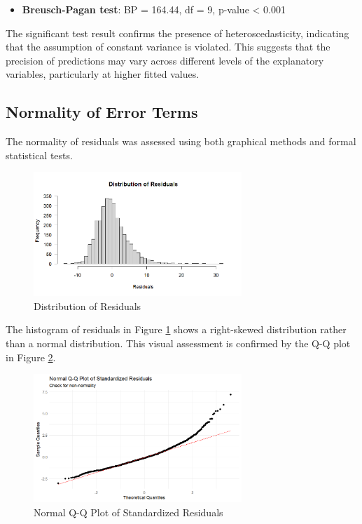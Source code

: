 \documentclass[12pt]{article}
\begin{document}
\begin{itemize}
    \item \textbf{Breusch-Pagan test}: BP = 164.44, df = 9, p-value < 0.001
\end{itemize}

The significant test result confirms the presence of heteroscedasticity, indicating that the assumption of constant variance is violated. This suggests that the precision of predictions may vary across different levels of the explanatory variables, particularly at higher fitted values.

\subsection{Normality of Error Terms}

The normality of residuals was assessed using both graphical methods and formal statistical tests.

\begin{figure}[H]
\centering
\includegraphics[width=0.7\textwidth]{media/Distribution of Residuals.png}
\caption{Distribution of Residuals}
\label{fig:residuals}
\end{figure}

The histogram of residuals in Figure \ref{fig:residuals} shows a right-skewed distribution rather than a normal distribution. This visual assessment is confirmed by the Q-Q plot in Figure \ref{fig:qq_plot}.

\begin{figure}[H]
\centering
\includegraphics[width=0.7\textwidth]{media/Normal_QQ_Plot.png}
\caption{Normal Q-Q Plot of Standardized Residuals}
\label{fig:qq_plot}
\end{figure}
\end{document}
